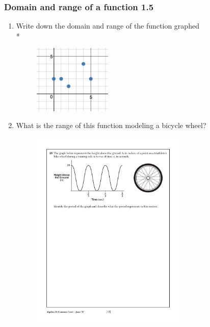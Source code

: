 \documentclass{beamer}
\begin{document}
\frame
{
  \frametitle{Domain and range of a function  \alert{1.5}}
  \begin{enumerate}
    \item Write down the domain and range of the function graphed\\*
    \begin{figure}[!ht]
        \centering
        \includegraphics[width=0.35\textwidth]{discrete-domain-graph.jpeg}
    \end{figure}

    \item What is the range of this function modeling a bicycle wheel?
    \begin{figure}[!ht]
        \centering
        \includegraphics[width=0.70\textwidth]{sine-bike-wheel.pdf}
    \end{figure}
  \end{enumerate}
  }
\end{document}
